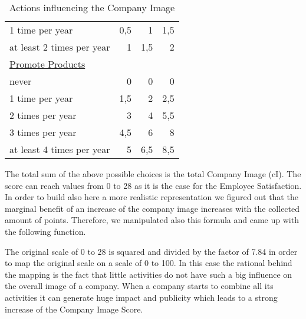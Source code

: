 \begin{table}[]
\begin{tabular}{|l|r|r|r|}
1 time per year                                 & 0,5                                 & 1                          & 1,5                    \\
at least 2 times per year                       & 1                                   & 1,5                        & 2                      \\
\underline{Promote Products}                          &                                     &                            &                        \\
never                                           & 0                                   & 0                          & 0                      \\
1 time per year                                 & 1,5                                 & 2                          & 2,5                    \\
2 times per year                                & 3                                   & 4                          & 5,5                    \\
3 times per year                                & 4,5                                 & 6                          & 8                      \\
at least 4 times per year                       & 5                                   & 6,5                        & 8,5  \\
\hline
\end{tabular}
\caption{Actions influencing the Company Image}
\label{calculation_CI}
\end{table}

The total sum of the above possible choices is the total Company Image (\gls{cI}). The score can reach values from 0 to 28 as it is the case for the Employee Satisfaction. In order to build also here a more realistic representation we figured out that the marginal benefit of an increase of the company image increases with the collected amount of points. Therefore, we manipulated also this formula and came up with the following function.


The original scale of 0 to 28 is squared and divided by the factor of 7.84 in order to map the original scale on a scale of 0 to 100. In this case the rational behind the mapping is the fact that little activities do not have such  a big influence on the overall image of a company. When a company starts to combine all its activities it can generate huge impact and publicity which leads to a strong increase of the Company Image Score.